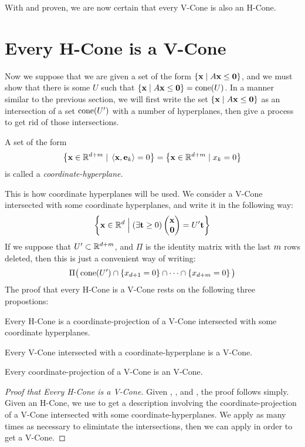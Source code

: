 With  and  proven, we are now certain that every V-Cone is also an H-Cone.

\section{Every H-Cone is a V-Cone}

Now we suppose that we are given a set of the form $\left\{\mathbf{x}\;|\; A\mathbf{x}\leq\mathbf{0}\right\}$, and we must show that there is some $U$ such that $\left\{\mathbf{x}\;|\; A\mathbf{x}\leq\mathbf{0}\right\} = \operatorname{cone}(U)$.  In a manner similar to the previous section, we will first write the set $\left\{\mathbf{x}\;|\; A\mathbf{x}\leq\mathbf{0}\right\}$ as an intersection of a set $\operatorname{cone}(U')$ with a number of hyperplanes, then give a process to get rid of those intersections.

\begin{Def}
	A set of the form
	\[ \left\{\mathbf{x} \in \mathbb{R}^{d+m} \;|\; \left\langle \mathbf{x}, \mathbf{e}_k \right\rangle = 0\right\} =
		\left\{\mathbf{x} \in \mathbb{R}^{d+m} \;|\; x_k = 0\right\}
	\]
	is called a \em{coordinate-hyperplane}.
\end{Def}

This is how coordinate hyperplanes will be used.  We consider a V-Cone intersected with some coordinate hyperplanes, and write it in the following way:
\begin{equation}\label{eq:coneintform1}
	\set{\xv \St (\exists \t \geq 0) \xz = U'\t}
\end{equation}
If we suppose that $U' \subset \mathbb{R}^{d+m}$, and $\Pi$ is the identity matrix with the last $m$ rows deleted, then this is just a convenient way of writing:
\begin{equation}\label{eq:coneintform2}
	\Pi\big(\operatorname{cone}(U') \cap \left\{x_{d+1} = 0\right\}
	\cap \dots \cap \left\{x_{d+m} = 0\right\}\big)
\end{equation}
The proof that every H-Cone is a V-Cone rests on the following three propostions:
\begin{Lemma}\label{hconelift}
  Every H-Cone is a coordinate-projection of a V-Cone intersected with some coordinate hyperplanes.
\end{Lemma}
\begin{Lemma}\label{vconeintersect}
  Every V-Cone intersected with a coordinate-hyperplane is a V-Cone.
\end{Lemma}
\begin{Lemma}\label{vconeproject}
  Every coordinate-projection of a V-Cone is an V-Cone.
\end{Lemma}

\begin{proof}[Proof that Every H-Cone is a V-Cone]
	Given , , and , the proof follows simply.  Given an H-Cone, we use  to get a description involving the coordinate-projection of a V-Cone intersected with some coordinate-hyperplanes.  We apply  as many times as necessary to elimintate the intersections, then we can apply  in order to get a V-Cone.
\end{proof}


